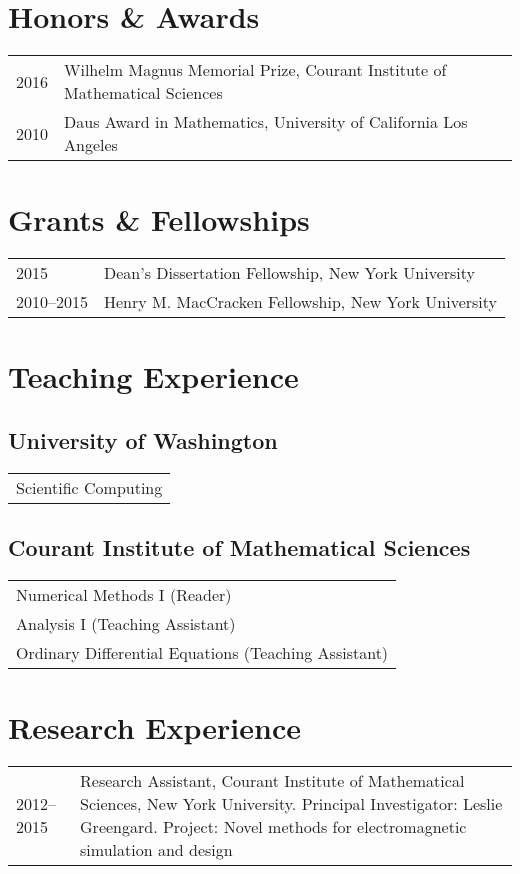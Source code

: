 
\section{Honors \& Awards}
\begin{tabular}{p{2cm}p{15cm}}
2016 & Wilhelm Magnus Memorial Prize, Courant Institute of Mathematical Sciences \\
2010 & Daus Award in Mathematics, University of California Los Angeles
\end{tabular}

\section{Grants \& Fellowships}
\begin{tabular}{p{2cm}p{15cm}}
2015 & Dean's Dissertation Fellowship, New York University \\
2010--2015 & Henry M. MacCracken Fellowship, New York University \\
\end{tabular}

\section{Teaching Experience}

\subsection{University of Washington}

\begin{tabular}{p{17cm}}
Scientific Computing \\
\end{tabular}

\subsection{Courant Institute of Mathematical Sciences}

\begin{tabular}{p{17cm}}
Numerical Methods I (Reader) \\
Analysis I (Teaching Assistant) \\
Ordinary Differential Equations (Teaching Assistant)
\end{tabular}

\section{Research Experience}
\begin{tabular}{p{2cm}p{15cm}}
2012--2015 & Research Assistant, Courant Institute of Mathematical Sciences, New York University.
Principal Investigator: Leslie Greengard. Project: Novel methods for
electromagnetic simulation and design \\
\end{tabular}

